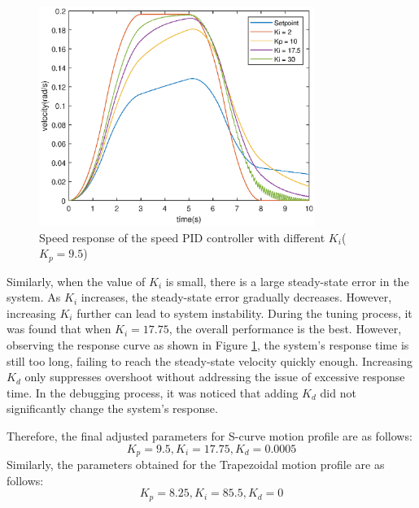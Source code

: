 \documentclass[11pt,a4paper]{article}%
\begin{document}
\begin{figure}[H]
    \centering  
    \includegraphics[width=0.8\textwidth]{SpeedKi}
    \caption{Speed response of the speed PID controller with different $K_i$($K_p=9.5$)}
    \label{SpeedKi}
\end{figure}
Similarly, when the value of $K_i$ is small, there is a large steady-state error in the system. As $K_i$ increases, the steady-state error gradually decreases. However, increasing $K_i$ further can lead to system instability. During the tuning process, it was found that when $K_i=17.75$, the overall performance is the best. However, observing the response curve as shown in Figure \ref{SpeedKi}, the system's response time is still too long, failing to reach the steady-state velocity quickly enough. Increasing $K_d$ only suppresses overshoot without addressing the issue of excessive response time. In the debugging process, it was noticed that adding $K_d$ did not significantly change the system's response.

Therefore, the final adjusted parameters for S-curve motion profile are as follows:
$$K_p=9.5, K_i=17.75, K_d=0.0005$$
Similarly, the parameters obtained for the Trapezoidal motion profile are as follows:
$$K_p=8.25, K_i=85.5, K_d=0$$
\end{document}
